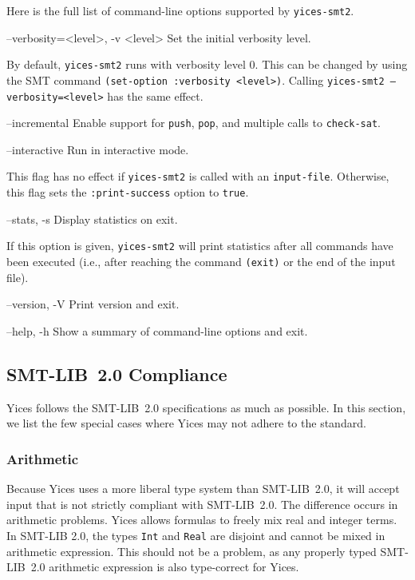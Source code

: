 \documentclass[11pt,twoside,fleqn,openright,titlepage]{cslreport}
\newenvironment{options}{
\begin{list}{}{
\setlength{\labelsep}{1.8ex}
\setlength{\labelwidth}{0pt}
\setlength{\itemindent}{-0.5\leftmargin}
\settowidth{\leftmargin}{\texttt{--}}
\renewcommand{\makelabel}{\optionlabel}}}
{\end{list}}
\newcommand*\optionlabel[1]{\hspace\labelsep\texttt{#1}}
\begin{document}
\medskip \noindent
Here is the full list of command-line options supported by
\texttt{yices-smt2}.
\begin{options}
\item[--verbosity=<level>, -v <level>] Set the initial verbosity level.

  By default, \texttt{yices-smt2} runs with verbosity level 0. This
  can be changed by using the SMT command \texttt{(set-option :verbosity <level>)}.
  Calling \texttt{yices-smt2 --verbosity=<level>} has the same effect.

\item[--incremental] Enable support for \texttt{push},
  \texttt{pop}, and multiple calls to \texttt{check-sat}.

\item[--interactive] Run in interactive mode.

   This flag has no effect if \texttt{yices-smt2} is called with an
   \texttt{input-file}. Otherwise, this flag sets the
   \texttt{:print-success} option to \texttt{true}.

\item[--stats, -s] Display statistics on exit.

  If this option is given, \texttt{yices-smt2} will print statistics
  after all commands have been executed (i.e., after reaching the
  command \texttt{(exit)} or the end of the input file).

\item[--version, -V] Print version and exit.

\item[--help, -h] Show a summary of command-line options and exit.

\end{options}


\subsection{SMT-LIB~2.0 Compliance}

Yices follows the SMT-LIB~2.0 specifications as much as possible. In
this section, we list the few special cases where Yices may not adhere
to the standard.

\subsubsection*{Arithmetic}

Because Yices uses a more liberal type system than SMT-LIB~2.0, it
will accept input that is not strictly compliant with SMT-LIB~2.0. The
difference occurs in arithmetic problems. Yices allows formulas to
freely mix real and integer terms. In SMT-LIB 2.0, the types
\texttt{Int} and \texttt{Real} are disjoint and cannot be mixed in
arithmetic expression. This should not be a problem, as any properly
typed SMT-LIB~2.0 arithmetic expression is also type-correct for
Yices.
\end{document}
